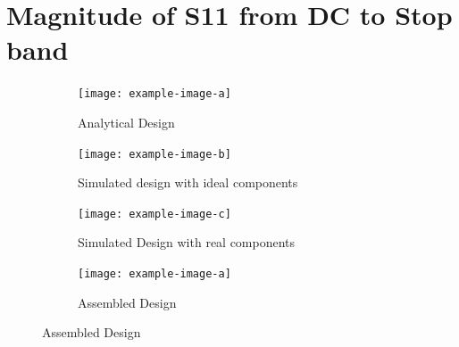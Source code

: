 \documentclass[letterpaper,12pt]{article}
\begin{document}
\newpage
\section{Magnitude of S11 from DC to Stop band}
\begin{figure}[H]
    \begin{subfigure}[t]{.49\textwidth}
      \centering
      \texttt{[image: example-image-a]}
      \caption{Analytical Design}
    \end{subfigure}
    \hfill
    \begin{subfigure}[t]{.49\textwidth}
      \centering
      \texttt{[image: example-image-b]}
      \caption{Simulated design with ideal components}
    \end{subfigure}
  
    \medskip
  
    \begin{subfigure}[t]{.49\textwidth}
      \centering
      \texttt{[image: example-image-c]}
      \caption{Simulated Design with real components}
    \end{subfigure}
    \hfill
    \begin{subfigure}[t]{.49\textwidth}
      \centering
      \texttt{[image: example-image-a]}
      \caption{Assembled Design}
    \end{subfigure}
  \end{figure}

\newpage
\end{document}
